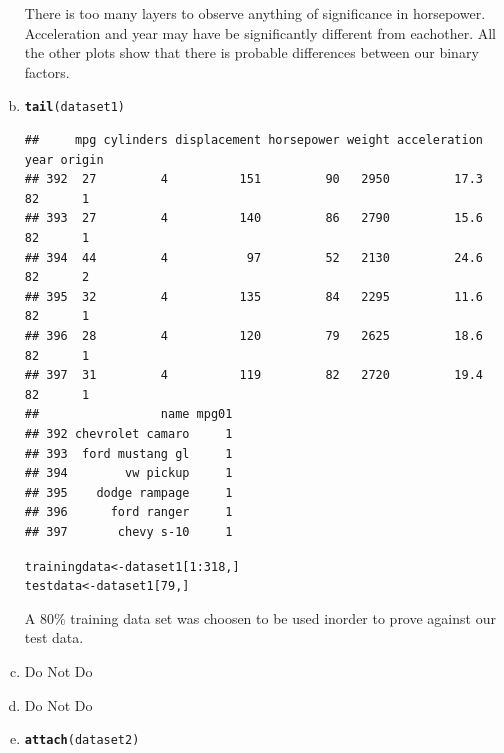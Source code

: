 \documentclass{article}\usepackage[]{graphicx}\usepackage[]{color}
\makeatletter
\newcommand{\hlnum}[1]{\textcolor[rgb]{0.686,0.059,0.569}{#1}}%
\newcommand{\hlopt}[1]{\textcolor[rgb]{0,0,0}{#1}}%
\newcommand{\hlstd}[1]{\textcolor[rgb]{0.345,0.345,0.345}{#1}}%
\newcommand{\hlkwb}[1]{\textcolor[rgb]{0.69,0.353,0.396}{#1}}%
\newcommand{\hlkwd}[1]{\textcolor[rgb]{0.737,0.353,0.396}{\textbf{#1}}}%
\newenvironment{kframe}{%
 \def\at@end@of@kframe{}%
 \ifinner\ifhmode%
  \def\at@end@of@kframe{\end{minipage}}%
  \begin{minipage}{\columnwidth}%
 \fi\fi%
 \def\FrameCommand##1{\hskip\@totalleftmargin \hskip-\fboxsep
 \colorbox{shadecolor}{##1}\hskip-\fboxsep
     \hskip-\linewidth \hskip-\@totalleftmargin \hskip\columnwidth}%
 \MakeFramed {\advance\hsize-\width
   \@totalleftmargin\z@ \linewidth\hsize
   \@setminipage}}%
 {\par\unskip\endMakeFramed%
 \at@end@of@kframe}
\newenvironment{knitrout}{}{} %
\makeatother
\begin{document}
\begin{enumerate}[(a)]
There is too many layers to observe anything of significance in horsepower. Acceleration and year may have be significantly different from eachother. All the other plots show that there is probable differences between our binary factors.
\item
\begin{knitrout}
\color{fgcolor}\begin{kframe}
\begin{alltt}
\hlkwd{tail}\hlstd{(dataset1)}
\end{alltt}
\begin{verbatim}
##     mpg cylinders displacement horsepower weight acceleration year origin
## 392  27         4          151         90   2950         17.3   82      1
## 393  27         4          140         86   2790         15.6   82      1
## 394  44         4           97         52   2130         24.6   82      2
## 395  32         4          135         84   2295         11.6   82      1
## 396  28         4          120         79   2625         18.6   82      1
## 397  31         4          119         82   2720         19.4   82      1
##                 name mpg01
## 392 chevrolet camaro     1
## 393  ford mustang gl     1
## 394        vw pickup     1
## 395    dodge rampage     1
## 396      ford ranger     1
## 397       chevy s-10     1
\end{verbatim}
\begin{alltt}
\hlstd{trainingdata}\hlkwb{<-}\hlstd{dataset1[}\hlnum{1}\hlopt{:}\hlnum{318}\hlstd{,]}
\hlstd{testdata}\hlkwb{<-}\hlstd{dataset1[}\hlnum{79}\hlstd{,]}
\end{alltt}
\end{kframe}
\end{knitrout}
A $80\%$ training data set was choosen to be used inorder to prove against our test data.

\item
Do Not Do
\item
Do Not Do
\item
\begin{knitrout}
\color{fgcolor}\begin{kframe}
\begin{alltt}
\hlkwd{attach}\hlstd{(dataset2)}
\end{alltt}



\end{kframe}
\end{knitrout}
\end{enumerate}
\end{document}
